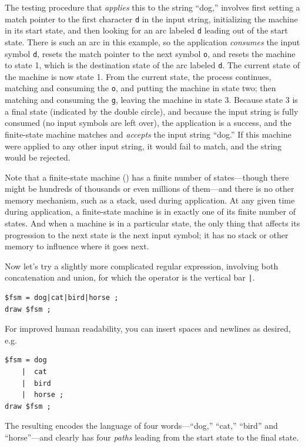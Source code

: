 The testing procedure that \emph{applies} this \fsm{} to the string ``dog,'' involves
first setting a match pointer to the first character \texttt{d} in the input string, 
initializing the machine in
its start state, and then looking for an arc labeled \texttt{d} leading out of the
start state.  There is such an arc in this example, so the application 
\emph{consumes} the input symbol \texttt{d}, resets the match pointer to the next
symbol \texttt{o}, and resets
the machine to state 1,
which is the destination state of the arc labeled \texttt{d}.
The current
state of the machine is now state 1.  From the current state, the
process continues, matching and consuming the \texttt{o}, and putting the machine in
state two; then matching and consuming the \texttt{g}, leaving the machine in state 3.
Because state 3 is a final state (indicated by the double circle), and because the input 
string is fully consumed (no input symbols are left over), the
application is a success, and the finite-state machine matches and \emph{accepts} the input string
``dog.''  If this machine were applied to any other input string, it would fail to match, and the
string would be rejected.   

Note that a finite-state machine (\fsm{}) has a finite number of states---though there
might be hundreds of thousands or even millions of them---and there is no other memory
mechanism, such as a stack, used during application.  At any given time during
application, a finite-state machine is in exactly one of its finite number of states.
And when a machine is in a particular state, the only thing that affects its
progression
to the next state is the next input symbol; it has no stack or other memory to
influence where it goes next.

Now let's try a slightly more complicated regular expression, involving both
concatenation and union, for which the operator is the vertical bar \verb!|!. 

\begin{Verbatim}
$fsm = dog|cat|bird|horse ;
draw $fsm ;
\end{Verbatim}

\noindent
For improved human readability, you can insert spaces and newlines as desired, e.g.

\begin{Verbatim}
$fsm = dog
    |  cat
    |  bird
    |  horse ;
draw $fsm ;
\end{Verbatim}

\noindent
The resulting \fsm{} encodes the language of four words---``dog,'' ``cat,'' ``bird''
and ``horse''---and clearly has four \emph{paths} leading from the start state to the
final state.


